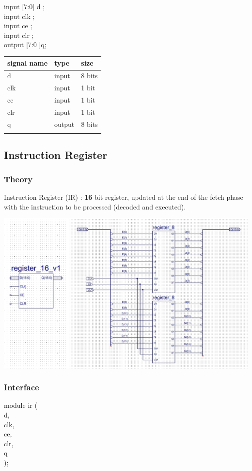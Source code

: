 \documentclass[11pt]{article}
\begin{document}
input [7:0] d     ; \\
input clk         ;   \\
input ce      ; \\
input clr     ; \\
output [7:0 ]q; \\

\begin{center}
\begin{tabular}{lll}
signal name & type & size\\
\hline
d & input & 8 bits\\
clk & input & 1 bit\\
ce & input & 1 bit\\
clr & input & 1 bit\\
q & output & 8 bits\\
 &  & \\
\hline
\end{tabular}
\end{center}
\subsection{Instruction Register}
\label{sec:orgd72ce65}
\subsubsection{Theory}
\label{sec:org948ceb0}
Instruction Register (IR) : \textbf{16} bit register, updated at the end of the fetch phase with the instruction to be processed (decoded and executed).
\begin{center}
\includegraphics[width=.9\linewidth]{./images/reg16.jpg}
\end{center}
\subsubsection{Interface}
\label{sec:org551ce80}
module ir (\\
    d,\\
    clk,\\
    ce,\\
    clr,\\
    q\\
    );\\
\end{document}

